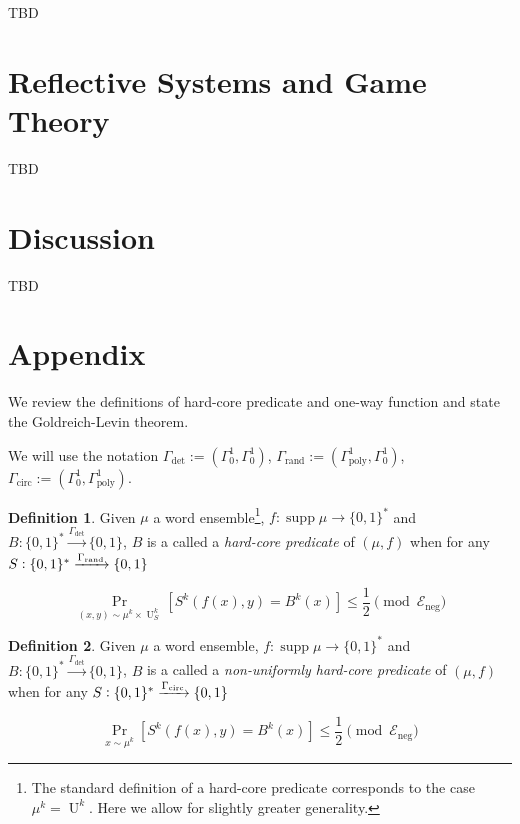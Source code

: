 \documentclass{article}
\numberwithin{equation}{section}
\theoremstyle{definition}
\newtheorem{definition}{Definition}[section]
\theoremstyle{plain}
\newcommand{\Bool}{\{0,1\}}
\newcommand{\Words}{{\Bool^*}}
\DeclareMathOperator{\Supp}{supp}
\DeclareMathOperator{\Prb}{Pr}
\DeclareMathOperator{\Un}{U}
\newcommand{\Fall}{\mathcal{E}}
\begin{document}
TBD

\section{Reflective Systems and Game Theory}
\label{sec:reflective}


TBD

\section{Discussion}
\label{sec:discussion}

TBD

\appendix

\section{Appendix}

We review the definitions of hard-core predicate and one-way function and state the Goldreich-Levin theorem.

We will use the notation $\Gamma_{\text{det}}:=(\Gamma_0^1,\Gamma_0^1)$, $\Gamma_{\text{rand}}:=(\Gamma_{\text{poly}}^1,\Gamma_0^1)$, ${\Gamma_{\text{circ}}:=(\Gamma_0^1,\Gamma_{\text{poly}}^1)}$.

\begin{samepage}
\begin{definition}

Given $\mu$ a word ensemble\footnote{The standard definition of a hard-core predicate corresponds to the case $\mu^k=\Un^k$. Here we allow for slightly greater generality.}, $f: \Supp \mu \rightarrow \Words$ and ${B: \Words \xrightarrow{\Gamma_{\text{det}}} \Bool}$, $B$ is a called a \emph{hard-core predicate} of $(\mu,f)$ when for any $S: \Words \xrightarrow{\Gamma_{\textnormal{rand}}} \Bool$

\begin{equation}
\Prb_{(x,y) \sim \mu^k \times \Un_S^k}[S^k(f(x),y)=B^k(x)] \leq \frac{1}{2} \pmod {\Fall_{\text{neg}}}
\end{equation}

\end{definition}
\end{samepage}

\begin{samepage}
\begin{definition}

Given $\mu$ a word ensemble, $f: \Supp \mu \rightarrow \Words$ and ${B: \Words \xrightarrow{\Gamma_{\text{det}}} \Bool}$, $B$ is a called a \emph{non-uniformly hard-core predicate} of $(\mu,f)$ when for any ${S: \Words \xrightarrow{\Gamma_{\textnormal{circ}}} \Bool}$ 

\begin{equation}
\Prb_{x \sim \mu^k}[S^k(f(x),y)=B^k(x)] \leq \frac{1}{2} \pmod {\Fall_{\text{neg}}}
\end{equation}

\end{definition}
\end{samepage}
\end{document}
